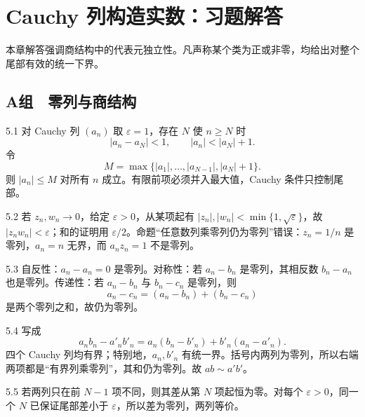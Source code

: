 \chapter{Cauchy 列构造实数：习题解答}

\begin{chapterguide}
本章解答强调商结构中的代表元独立性。凡声称某个类为正或非零，均给出对整个尾部有效的统一下界。
\end{chapterguide}

\section*{A组　零列与商结构}

\begin{solution}{5.1}
对 Cauchy 列 \((a_n)\) 取 \(\varepsilon=1\)，存在 \(N\) 使 \(n\ge N\) 时
\[
 |a_n-a_N|<1,\qquad |a_n|<|a_N|+1.
\]
令
\[
 M=\max\{|a_1|,\ldots,|a_{N-1}|,|a_N|+1\}.
\]
则 \(|a_n|\le M\) 对所有 \(n\) 成立。有限前项必须并入最大值，Cauchy 条件只控制尾部。
\end{solution}

\begin{solution}{5.2}
若 \(z_n,w_n\to0\)，给定 \(\varepsilon>0\)，从某项起有 \(|z_n|,|w_n|<\min\{1,\sqrt{\varepsilon}\}\)，故 \(|z_nw_n|<\varepsilon\)；和的证明用 \(\varepsilon/2\)。命题“任意数列乘零列仍为零列”错误：\(z_n=1/n\) 是零列，\(a_n=n\) 无界，而 \(a_nz_n=1\) 不是零列。
\end{solution}

\begin{solution}{5.3}
自反性：\(a_n-a_n=0\) 是零列。对称性：若 \(a_n-b_n\) 是零列，其相反数 \(b_n-a_n\) 也是零列。传递性：若 \(a_n-b_n\) 与 \(b_n-c_n\) 是零列，则
\[
 a_n-c_n=(a_n-b_n)+(b_n-c_n)
\]
是两个零列之和，故仍为零列。
\end{solution}

\begin{solution}{5.4}
写成
\[
 a_nb_n-a'_nb'_n=a_n(b_n-b'_n)+b'_n(a_n-a'_n).
\]
四个 Cauchy 列均有界；特别地，\(a_n,b'_n\) 有统一界。括号内两列为零列，所以右端两项都是“有界列乘零列”，其和仍为零列。故 \(ab\sim a'b'\)。
\end{solution}

\begin{solution}{5.5}
若两列只在前 \(N-1\) 项不同，则其差从第 \(N\) 项起恒为零。对每个 \(\varepsilon>0\)，同一个 \(N\) 已保证尾部差小于 \(\varepsilon\)，所以差为零列，两列等价。
\end{solution}

